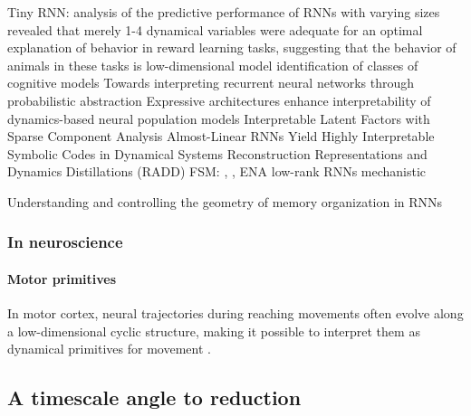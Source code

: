 \documentclass{article}
\theoremstyle{definition} \newtheorem{definition}{Definition}  \newtheorem{example}{Example}
\theoremstyle{remark} \newtheorem{remark}{Remark}
\newcounter{ct}
\begin{document}
Tiny RNN\citep{jian2023tinyrnn}: analysis of the predictive performance of RNNs with varying sizes revealed that merely 1-4 dynamical variables were adequate for an optimal explanation of behavior in reward learning tasks, suggesting that the behavior of animals in these tasks is low-dimensional
model identification of classes of cognitive models\citep{rmus2024artificial}
Towards interpreting recurrent neural networks through probabilistic abstraction \citep{dong2020towards}
Expressive architectures enhance interpretability of dynamics-based neural population models \citep{sedler2023expressive}
Interpretable Latent Factors with Sparse Component Analysis \citep{zimnik2024identifying}
Almost-Linear RNNs Yield Highly Interpretable Symbolic Codes in Dynamical Systems Reconstruction \citep{brenner2024almost}
\citep{he2024multilevel}
\citep{schaeffer2020reverseengineering} Representations and Dynamics Distillations (RADD)
\citep{turner2023simplicity}
FSM: \citep{oliva2019fsm}, \citep{cotteret2024fsm},  ENA \citep{ceni2020interpreting}
low-rank RNNs \citep{beiran2021shaping, valente2022extracting, valente2022probing}
mechanistic \citep{qian2024partial}
\citep{Nassar2018b}

Understanding and controlling the geometry of memory organization in RNNs \citep{haputhanthri2025understanding}

\subsubsection{In neuroscience}
\paragraph{Motor primitives}
In motor cortex, neural trajectories during reaching movements often evolve along a low-dimensional cyclic structure, making it possible to interpret them as dynamical primitives for movement \citep{ijspeert2013dynamical}.

\citep{marton2021efficient}



\subsection{A timescale angle to reduction}
\citep{cavanagh2020diversity}




\end{document}
